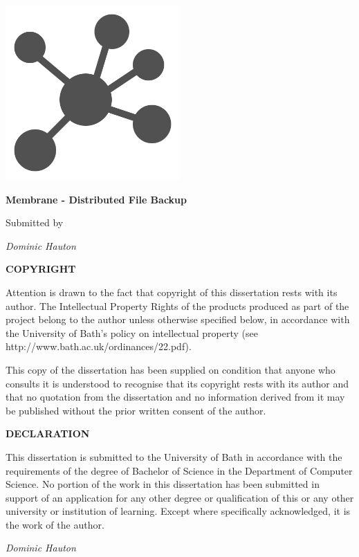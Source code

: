 \documentclass[11pt, a4paper, twocolumn, twoside]{report}
\begin{document}
\begin{titlepage}
	\centering
	\includegraphics[width=0.5\textwidth]{membrane-logo}\par\vspace{1cm}
	{\huge\bfseries Membrane - Distributed File Backup\par}
	\vspace{1cm}
	Submitted by 
	{\Large\itshape Dominic Hauton\par}
	
	
	\vfill
	
	
	\justifying
	\noindent
	\textbf{COPYRIGHT}
	
	\vspace{0.25cm}
	\noindent
	Attention is drawn to the fact that copyright of this dissertation rests with its author. The Intellectual Property Rights of the products produced as part of the project belong to the author unless otherwise specified below, in accordance with the University of Bath’s policy on intellectual property (see http://www.bath.ac.uk/ordinances/22.pdf).
	
	\vspace{0.5cm}
	\noindent
	This copy of the dissertation has been supplied on condition that anyone who consults it is understood to recognise that its copyright rests with its author and that no quotation from the dissertation and no information derived from it may be published without the prior written consent of the author.
	
	\vspace{0.5cm}
	\noindent
	\textbf{DECLARATION}
	
	\vspace{0.25cm}
	\noindent
	This dissertation is submitted to the University of Bath in accordance with the requirements of the degree of Bachelor of Science in the Department of Computer Science. No portion of the work in this dissertation has been submitted in support of an application for any other degree or qualification of this or any other university or institution of learning. Except where specifically acknowledged, it is the work of the author.
	
	\vspace{0.25cm}
	\noindent
	\emph{Dominic Hauton}
	
\end{titlepage}
\end{document}
